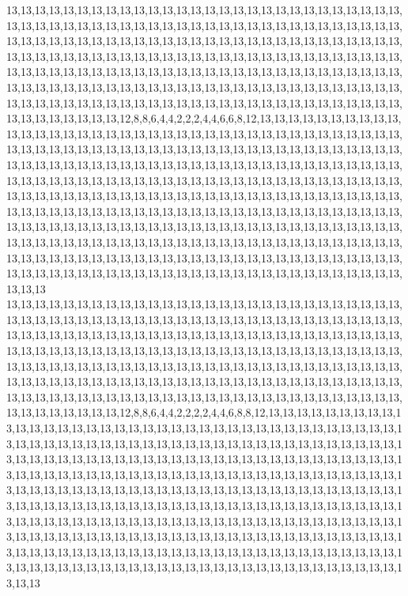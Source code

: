 13,13,13,13,13,13,13,13,13,13,13,13,13,13,13,13,13,13,13,13,13,13,13,13,13,13,13,13,13,13,13,13,13,13,13,13,13,13,13,13,13,13,13,13,13,13,13,13,13,13,13,13,13,13,13,13,13,13,13,13,13,13,13,13,13,13,13,13,13,13,13,13,13,13,13,13,13,13,13,13,13,13,13,13,13,13,13,13,13,13,13,13,13,13,13,13,13,13,13,13,13,13,13,13,13,13,13,13,13,13,13,13,13,13,13,13,13,13,13,13,13,13,13,13,13,13,13,13,13,13,13,13,13,13,13,13,13,13,13,13,13,13,13,13,13,13,13,13,13,13,13,13,13,13,13,13,13,13,13,13,13,13,13,13,13,13,13,13,13,13,13,13,13,13,13,13,13,13,13,13,13,13,13,13,13,13,13,13,13,13,13,13,13,13,13,13,13,13,13,13,13,13,13,13,12,8,8,6,4,4,2,2,2,4,4,6,6,8,12,13,13,13,13,13,13,13,13,13,13,13,13,13,13,13,13,13,13,13,13,13,13,13,13,13,13,13,13,13,13,13,13,13,13,13,13,13,13,13,13,13,13,13,13,13,13,13,13,13,13,13,13,13,13,13,13,13,13,13,13,13,13,13,13,13,13,13,13,13,13,13,13,13,13,13,13,13,13,13,13,13,13,13,13,13,13,13,13,13,13,13,13,13,13,13,13,13,13,13,13,13,13,13,13,13,13,13,13,13,13,13,13,13,13,13,13,13,13,13,13,13,13,13,13,13,13,13,13,13,13,13,13,13,13,13,13,13,13,13,13,13,13,13,13,13,13,13,13,13,13,13,13,13,13,13,13,13,13,13,13,13,13,13,13,13,13,13,13,13,13,13,13,13,13,13,13,13,13,13,13,13,13,13,13,13,13,13,13,13,13,13,13,13,13,13,13,13,13,13,13,13,13,13,13,13,13,13,13,13,13,13,13,13,13,13,13,13,13,13,13,13,13,13,13,13,13,13,13,13,13,13,13,13,13,13,13,13,13,13,13,13,13,13,13,13,13,13,13,13,13,13,13,13,13,13,13,13,13,13,13,13,13,13,13,13,13,13,13,13,13,13,13,13,13,13,13,13,13,13,13,13,13,13,13,13,13,13,13,13,13,13,13,13
13,13,13,13,13,13,13,13,13,13,13,13,13,13,13,13,13,13,13,13,13,13,13,13,13,13,13,13,13,13,13,13,13,13,13,13,13,13,13,13,13,13,13,13,13,13,13,13,13,13,13,13,13,13,13,13,13,13,13,13,13,13,13,13,13,13,13,13,13,13,13,13,13,13,13,13,13,13,13,13,13,13,13,13,13,13,13,13,13,13,13,13,13,13,13,13,13,13,13,13,13,13,13,13,13,13,13,13,13,13,13,13,13,13,13,13,13,13,13,13,13,13,13,13,13,13,13,13,13,13,13,13,13,13,13,13,13,13,13,13,13,13,13,13,13,13,13,13,13,13,13,13,13,13,13,13,13,13,13,13,13,13,13,13,13,13,13,13,13,13,13,13,13,13,13,13,13,13,13,13,13,13,13,13,13,13,13,13,13,13,13,13,13,13,13,13,13,13,13,13,13,13,13,13,12,8,8,6,4,4,2,2,2,2,4,4,6,8,8,12,13,13,13,13,13,13,13,13,13,13,13,13,13,13,13,13,13,13,13,13,13,13,13,13,13,13,13,13,13,13,13,13,13,13,13,13,13,13,13,13,13,13,13,13,13,13,13,13,13,13,13,13,13,13,13,13,13,13,13,13,13,13,13,13,13,13,13,13,13,13,13,13,13,13,13,13,13,13,13,13,13,13,13,13,13,13,13,13,13,13,13,13,13,13,13,13,13,13,13,13,13,13,13,13,13,13,13,13,13,13,13,13,13,13,13,13,13,13,13,13,13,13,13,13,13,13,13,13,13,13,13,13,13,13,13,13,13,13,13,13,13,13,13,13,13,13,13,13,13,13,13,13,13,13,13,13,13,13,13,13,13,13,13,13,13,13,13,13,13,13,13,13,13,13,13,13,13,13,13,13,13,13,13,13,13,13,13,13,13,13,13,13,13,13,13,13,13,13,13,13,13,13,13,13,13,13,13,13,13,13,13,13,13,13,13,13,13,13,13,13,13,13,13,13,13,13,13,13,13,13,13,13,13,13,13,13,13,13,13,13,13,13,13,13,13,13,13,13,13,13,13,13,13,13,13,13,13,13,13,13,13,13,13,13,13,13,13,13,13,13,13,13,13,13,13,13,13,13,13,13,13,13,13,13,13,13,13,13,13,13,13,13
